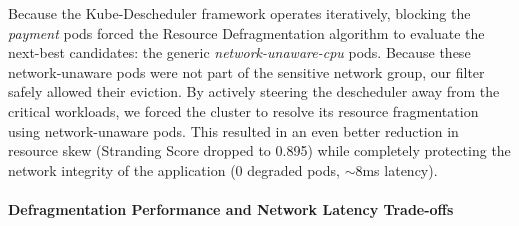 Because the Kube-Descheduler framework operates iteratively, blocking the \textit{payment} pods forced the Resource Defragmentation algorithm to evaluate the next-best candidates: the generic \textit{network-unaware-cpu} pods. Because these network-unaware pods were not part of the sensitive network group, our filter safely allowed their eviction. By actively steering the descheduler away from the critical workloads, we forced the cluster to resolve its resource fragmentation using network-unaware pods. This resulted in an even better reduction in resource skew (Stranding Score dropped to 0.895) while completely protecting the network integrity of the application (0 degraded pods, $\sim$8ms latency).

\paragraph{Defragmentation Performance and Network Latency Trade-offs}
\label{subsubsec:netaware4_resultanalysis3_tradeoff}

